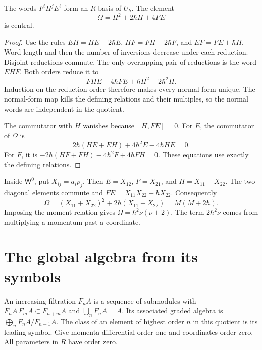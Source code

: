 \begin{lemma}\label{lem:qc-enveloping-basis}
The words $F^iH^jE^\ell$ form an $R$-basis of $U_\hbar$.
The element
\[
 \Omega=H^2+2\hbar H+4FE
\]
is central.
\end{lemma}
\begin{proof}
Use the rules $EH=HE-2\hbar E$, $HF=FH-2\hbar F$, and $EF=FE+\hbar H$.
Word length and then the number of inversions decrease under each reduction.
Disjoint reductions commute.
The only overlapping pair of reductions is the word $EHF$.
Both orders reduce it to
\[
 FHE-4\hbar FE+\hbar H^2-2\hbar^2H.
\]
Induction on the reduction order therefore makes every normal form unique.
The normal-form map kills the defining relations and their multiples, so the normal words are independent in the quotient.

The commutator with $H$ vanishes because $[H,FE]=0$.
For $E$, the commutator of $\Omega$ is
\[
 2\hbar(HE+EH)+4\hbar^2E-4\hbar HE=0.
\]
For $F$, it is
$-2\hbar(HF+FH)-4\hbar^2F+4\hbar FH=0$.
These equations use exactly the defining relations.
\end{proof}

Inside $\mathsf W^0$, put $X_{ij}=a_ip_j$.
Then $E=X_{12}$, $F=X_{21}$, and $H=X_{11}-X_{22}$.
The two diagonal elements commute and
$FE=X_{11}X_{22}+\hbar X_{22}$.
Consequently
\begin{equation}\label{eq:qc-casimir}
 \Omega=(X_{11}+X_{22})^2+2\hbar(X_{11}+X_{22})
 =M(M+2\hbar).
\end{equation}
Imposing the moment relation gives $\Omega=\hbar^2\nu(\nu+2)$.
The term $2\hbar^2\nu$ comes from multiplying a momentum past a coordinate.

\section{The global algebra from its symbols}

An increasing filtration $F_nA$ is a sequence of submodules with
$F_nA\,F_mA\subset F_{n+m}A$ and $\bigcup_nF_nA=A$.
Its associated graded algebra is $\bigoplus_nF_nA/F_{n-1}A$.
The class of an element of highest order $n$ in this quotient is its leading symbol.
Give momenta differential order one and coordinates order zero.
All parameters in $R$ have order zero.

